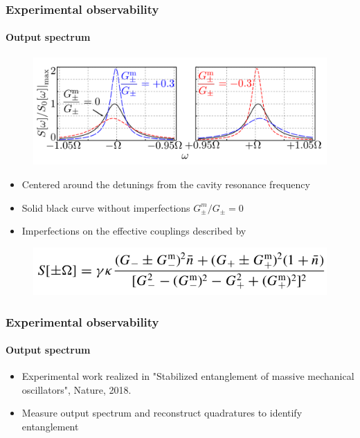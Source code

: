 \documentclass[aspectratio=43]{beamer}
\begin{document}
\begin{frame}

\frametitle{Experimental observability}
\framesubtitle{Output spectrum}
	
	\begin{figure}
		\includegraphics[width = 9 cm]{plots/plot_spectrum.png}
	\end{figure}	

	\begin{itemize}
		\item Centered around the detunings from the cavity resonance frequency
		\item Solid black curve without imperfections $G^{m}_{\pm}/G_{\pm} = 0$
		\item Imperfections on the effective couplings described by
	\end{itemize}

	\begin{figure}
		\includegraphics[width = 6.5 cm]{plots/spectrum_imperfections.png}
	\end{figure}

\end{frame}

\begin{frame}
	
	\frametitle{Experimental observability}
	\framesubtitle{Output spectrum}	
	
	\begin{itemize}
		\item Experimental work realized in {\color{blue}"Stabilized entanglement of massive mechanical oscillators"}, Nature, 2018.
		\item Measure output spectrum and reconstruct quadratures to identify entanglement
	\end{itemize}

\end{frame}
\end{document}

